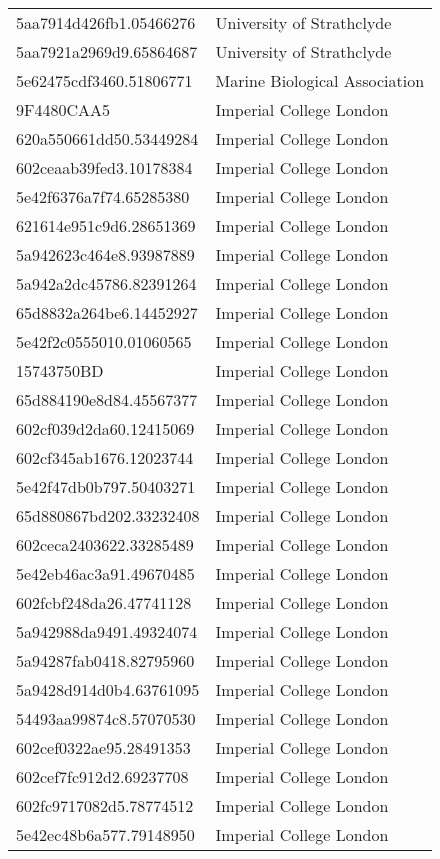 \begin{tabular}{ll}
5aa7914d426fb1.05466276 & University of Strathclyde \\
5aa7921a2969d9.65864687 & University of Strathclyde \\
5e62475cdf3460.51806771 & Marine Biological Association \\
9F4480CAA5 & Imperial College London \\
620a550661dd50.53449284 & Imperial College London \\
602ceaab39fed3.10178384 & Imperial College London \\
5e42f6376a7f74.65285380 & Imperial College London \\
621614e951c9d6.28651369 & Imperial College London \\
5a942623c464e8.93987889 & Imperial College London \\
5a942a2dc45786.82391264 & Imperial College London \\
65d8832a264be6.14452927 & Imperial College London \\
5e42f2c0555010.01060565 & Imperial College London \\
15743750BD & Imperial College London \\
65d884190e8d84.45567377 & Imperial College London \\
602cf039d2da60.12415069 & Imperial College London \\
602cf345ab1676.12023744 & Imperial College London \\
5e42f47db0b797.50403271 & Imperial College London \\
65d880867bd202.33232408 & Imperial College London \\
602ceca2403622.33285489 & Imperial College London \\
5e42eb46ac3a91.49670485 & Imperial College London \\
602fcbf248da26.47741128 & Imperial College London \\
5a942988da9491.49324074 & Imperial College London \\
5a94287fab0418.82795960 & Imperial College London \\
5a9428d914d0b4.63761095 & Imperial College London \\
54493aa99874c8.57070530 & Imperial College London \\
602cef0322ae95.28491353 & Imperial College London \\
602cef7fc912d2.69237708 & Imperial College London \\
602fc9717082d5.78774512 & Imperial College London \\
5e42ec48b6a577.79148950 & Imperial College London \\

\end{tabular}
